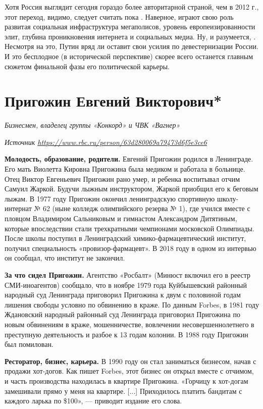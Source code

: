 Хотя Россия выглядит сегодня гораздо более авторитарной страной, чем в 2012 г., этот переход, видимо, следует считать пока .
Наверное, играют свою роль развитая социальная инфраструктура мегаполисов, уровень европеизированности элит, глубина проникновения интернета и социальных медиа. Ну, и разумеется, . Несмотря на это, Путин вряд ли оставит свои усилия по девестернизации России. И это бесплодное (в исторической перспективе)  скорее всего останется главным сюжетом финальной фазы его политической карьеры.


\newpage
\section[Евгений Пригожин]{Пригожин Евгений Викторович*}

\textit{Бизнесмен, владелец группы «Конкорд» и ЧВК «Вагнер»}

\textit{Источник \url{https://www.rbc.ru/person/63d280069a79473d6f5e3ce6}}

\textbf{Молодость, образование, родители.} Евгений Пригожин родился в Ленинграде. Его мать Виолетта Кировна Пригожина была медиком и работала в больнице. Отец Виктор Евгеньевич Пригожин рано умер, и ребенка воспитывал отчим Самуил Жаркой. Будучи лыжным инструктором, Жаркой приобщил его к беговым лыжам. В 1977 году Пригожин окончил ленинградскую спортивную школу-интернат № 62 (ныне колледж олимпийского резерва № 1), где учился вместе с пловцом Владимиром Сальниковым и гимнастом Александром Дитятиным, которые впоследствии стали трехкратными чемпионами московской Олимпиады. После школы поступил в Ленинградский химико-фармацевтический институт, получил специальность «провизор-фармацевт». В 2018 году в одном из интервью он сообщал, что институт не закончил.

\textbf{За что сидел Пригожин.} Агентство «Росбалт» (Минюст включил его в реестр СМИ-иноагентов) сообщало, что в ноябре 1979 года Куйбышевский районный народный суд Ленинграда приговорил Пригожина к двум с половиной годам лишения свободы условно по обвинению в краже. По данным Forbes, в 1981 году Ждановский народный районный суд Ленинграда приговорил Пригожина по новым обвинениям в краже, мошенничестве, вовлечении несовершеннолетнего в преступную деятельность и разбое к 13 годам колонии. В 1988 году Пригожин был помилован.

\textbf{Ресторатор, бизнес, карьера.} В 1990 году он стал заниматься бизнесом, начав с продажи хот-догов. Как пишет Forbes, этот бизнес он открыл вместе с отчимом, и часть производства находилась в квартире Пригожина. «Горчицу к хот-догам замешивали прямо у меня на квартире. [...] Приходилось платить бандитам с каждого ларька по \$100», — приводит издание его слова.

